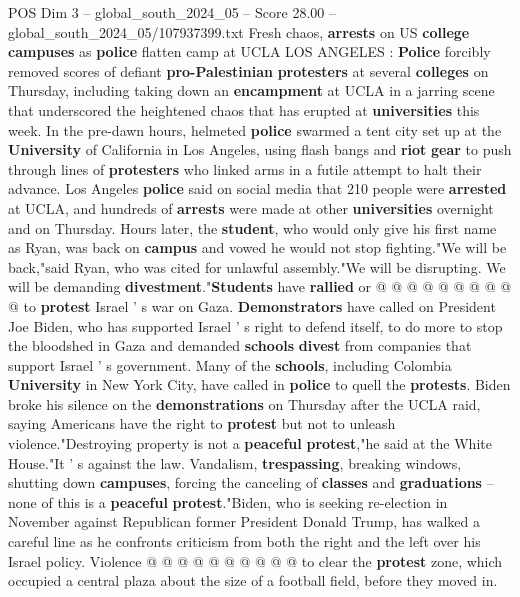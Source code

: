 \begin{textsample}{POS Dim 3 – global\_south\_2024\_05 – Score 28.00 – global\_south\_2024\_05/107937399.txt}  \label{ex:f3_pos_095}
Fresh chaos, \textbf{arrests} on US \textbf{college} \textbf{campuses} as \textbf{police} flatten camp at UCLA LOS ANGELES : \textbf{Police} forcibly removed scores of defiant \textbf{pro-Palestinian} \textbf{protesters} at several \textbf{colleges} on Thursday, including taking down an \textbf{encampment} at UCLA in a jarring scene that underscored the heightened chaos that has erupted at \textbf{universities} this week.
In the pre-dawn hours, helmeted \textbf{police} swarmed a tent city set up at the \textbf{University} of California in Los Angeles, using flash bangs and \textbf{riot} \textbf{gear} to push through lines of \textbf{protesters} who linked arms in a futile attempt to halt their advance.
Los Angeles \textbf{police} said on social media that 210 people were \textbf{arrested} at UCLA, and hundreds of \textbf{arrests} were made at other \textbf{universities} overnight and on Thursday.
Hours later, the \textbf{student}, who would only give his first name as Ryan, was back on \textbf{campus} and vowed he would not stop fighting."We will be back,"said Ryan, who was cited for unlawful assembly."We will be disrupting.
We will be demanding \textbf{divestment}."\textbf{Students} have \textbf{rallied} or @ @ @ @ @ @ @ @ @ @ to \textbf{protest} Israel ' s war on Gaza. \textbf{Demonstrators} have called on President Joe Biden, who has supported Israel ' s right to defend itself, to do more to stop the bloodshed in Gaza and demanded \textbf{schools} \textbf{divest} from companies that support Israel ' s government.
Many of the \textbf{schools}, including Colombia \textbf{University} in New York City, have called in \textbf{police} to quell the \textbf{protests}.
Biden broke his silence on the \textbf{demonstrations} on Thursday after the UCLA raid, saying Americans have the right to \textbf{protest} but not to unleash violence."Destroying property is not a \textbf{peaceful} \textbf{protest},"he said at the White House."It ' s against the law.
Vandalism, \textbf{trespassing}, breaking windows, shutting down \textbf{campuses}, forcing the canceling of \textbf{classes} and \textbf{graduations} -- none of this is a \textbf{peaceful} \textbf{protest}."Biden, who is seeking re-election in November against Republican former President Donald Trump, has walked a careful line as he confronts criticism from both the right and the left over his Israel policy.
Violence @ @ @ @ @ @ @ @ @ @ to clear the \textbf{protest} zone, which occupied a central plaza about the size of a football field, before they moved in.

\end{textsample}
